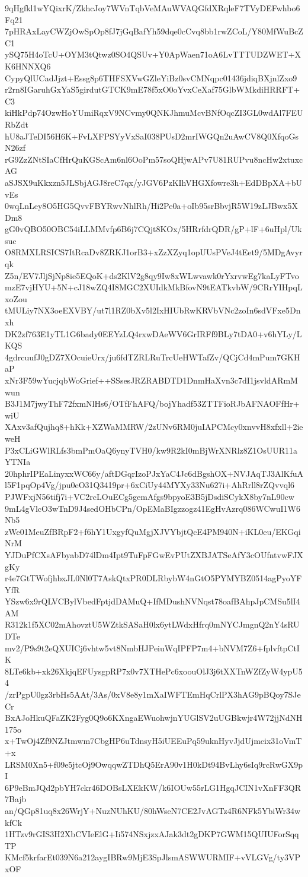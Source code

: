 9qHgfkl1wYQixrK/ZkhcJoy7WVnTqbVeMAuWVAQGfdXRqleF7TVyDEFwhbo6Fq21
7pHRAxLayCWZjOwSpOp8fJ7jGqBafYh59dqe0cCvq8bb1rwZCoL/Y80MfWuBcZC1
ySQ75H4oTcU+OYM3tQtwz0SO4QSUv+Y0ApWaen71oA6LvTTTUDZWET+XK6HNNXQ6
CypyQlUCadJjzt+Essg8p6THFSXVwGZleYiBz0svCMNqpc01436jdiqBXjnlZxo9
r2rn8IGaruhGxYaS5girdutGTCK9mE78f5xO0oYvxCeXaf75GlbWMkdiHRRFT+C3
kiHkPdp74OzwHoYUmiRqxV9NCvmy0QNKJhmuMcvBNfOqcZI3GL0wdAl7FEURbZdt
hU8aJTeDI56H6K+FvLXFPSYyVxSaI038PUsD2mrIWGQn2uAwCV8Q0XfqoGsN26zf
rG9ZzZNtSIaCfHrQuKGScAm6nl6OoPm57soQHjwAPv7U81RUPvu8ncHw2xtuxcAG
aSJSX9uKkxzn5JLSbjAGJ8reC7qx/yJGV6PzKIhVHGXfowre3h+EdDBpXA+bUvEs
0wqLnLey8O5HG5QvvFBYRwvNhlRh/Hi2Pe0a+oIb95srBbvjR5W19zLJBwx5XDm8
gG0vQBO50OBC54iLLMMvfp6B6j7CQjt8KOx/5HRrfdrQDR/gP+lF+6uHpl/Uksuc
O8RMXLRSICS7ItRcaDv8ZRKJ1orB3+xZzXZyq1opUUsPVeJ4tEet9/5MDgAvyrqk
Z5n/EV7JljSjNp8ie5EQoK+ds2KlV2g8qy9Iw8xWLwvawk0rYxrvwEg7kaLyFTvo
mzE7vjHYU+5N+cJ18wZQ4I8MGC2XUIdkMkBfovN9tEATkvbW/9CRrYIHpqLxoZou
tMULiy7NX3oeEXVBY/ut7l1RZ0bXv5l2IxHIUbRwKRVbVNc2zoIn6sdVFxe5Dnxh
DK2zf763E1yTL1G6bady0EEYzLQ4rxwDAeWV6GrIRFf9BLy7tDA0+v6hYLy/LKQS
4gdrcuufJ0gDZ7XOcuieUrx/ju6fdTZRLRuTrcUeHWTafZv/QCjCd4mPum7GKHaP
xNr3F59wYucjqbWoGrief++SSsesJRZRABDTD1DnmHaXvn3c7dI1jsvldARmMwun
B3J1M7jwyThF72fxmNlHs6/OTfFhAFQ/bojYhadf53ZTTFioRJbAFNAOFfHr+wiU
XAxv3afQujhq8+hKk+XZWaMMRW/2zUNv6RM0juIAPCMcy0xnvvH8xfxll+2ieweH
P3xCLiGWlRLfs3bmPmOaQ6ynyTVH0/kw9R2kI0mBjWrXNRlz8Z1OsUUR11aYTNIa
20hphrIPEaLinyxxWC66y/aftDGqrIzoPJxYaC4Jc6dBgshOX+NVJAqTJ3AlKfuA
l5F1pqOp4Vg/jpu0eO31Q3419pr+6xCiUy44MYXy33Nu627i+AhRrll8rZQvvql6
PJWFxjN56tifj7i+VC2rcLOuECg5gemAfgs9bpyoE3B5jDsdiSCykX8by7nL90cw
9mL4gVlcO3wTnD9J4sedOHbCPn/OpEMaBIgzzogz41EgHvAzrq086WCwuI1W6Nb5
zWe01MeuZfBRpF2+f6hY1UxgyfQuMgjXJVYbjtQcE4PM940N+iKL0eu/EKGqiNrM
YJDuPfCXsAFbyabD74lDm4Ipt9TuFpFGwEvPUtZXBJATSeAfY3cOUfntvwFJXgKy
r4e7GtTWofjhbxJL0Nl0T7AskQtxPR0DLRbybW4nGtO5PYMYBZ0514agPyoYFYfR
YSzw6x9rQLVCBylVbedFptjdDAMuQ+IfMDushNVNqst78oafBAhpJpCMSu5lI4AM
R312k1f5XC02mAhovztU5WZtkSASaH0lx6ytLWdxHfrq0mNYCJmgnQ2nY4sRUDTe
mv2/P9s9t2eQXUICj6vhtw5vt8NmbHJPeiuWqIPFP7m4+bNVM7Z6+fplvftpCtIK
8LTe6kb+xk26XkjqEFUysgpRP7x0v7XTHePc6xoouOlJ3j6tXXTnWZfZyW4ypU54
/zrPgpU0gz3rbHs5AAt/3As/0xV8e8y1mXaIWFTEmHqCrlPX3hAG9pBQoy7SJeCr
BxAJoHkuQFaZK2Fyg0Q9o6KXngaEWuohwjnYUGlSV2uUGBkwjr4W72jjNdNH175o
x+TwOj4Zf9NZJtmwm7CbgHP6uTdnsyH5iUEEuPq59uknHyvJjdUjmcix31oVmT+x
LRSM0Xn5+f09e5jtcOj9OwqqwZTDhQ5ErA90v1H0kDt94BvLhy6sIq9rcRwGX9pI
6P9eBmJQd2pbYH7ckr46DOBsLXEkKW/k6IOUw55rLG1HgqJCIN1vXnFF3QR7Bajb
an/QGp81uq8x26WrjY+NuzNUhKU/80hWseN7CE2JvAGTz4R6NFk5YbiWr34wkfCk
1HTzv9rGIS3H2XbCVIeElG+Ii574NSxjzxAJak3dt2gDKP7GWM15QUIUForSqqTP
KMcf5krfarEt039N6a212aygIBRw9MjE3SpJlsmASWWURMIF+vVLGVg/ty3VPxOF
